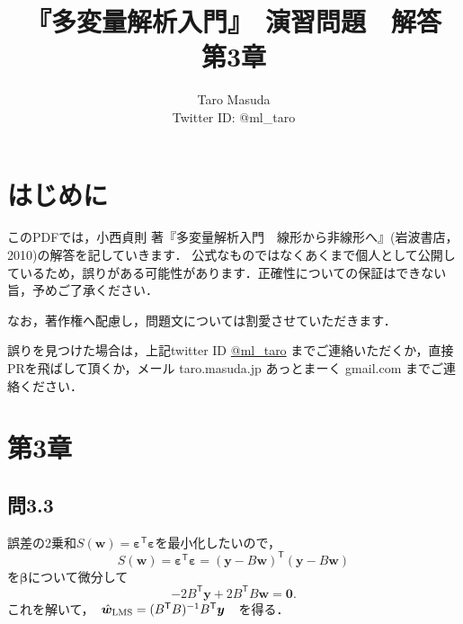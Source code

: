 \documentclass[pdflatex,ja=standard]{bxjsarticle}
\title{『多変量解析入門』　演習問題　解答　第3章}
\author{Taro Masuda \\ Twitter ID: @ml\_taro}
\begin{document}
\maketitle

\section*{はじめに}
このPDFでは，小西貞則 著『多変量解析入門　線形から非線形へ』(岩波書店，2010)の解答を記していきます．
公式なものではなくあくまで個人として公開しているため，誤りがある可能性があります．正確性についての保証はできない旨，予めご了承ください．

なお，著作権へ配慮し，問題文については割愛させていただきます．

誤りを見つけた場合は，上記twitter ID \href{https://twitter.com/ml_taro}{@ml\_taro} までご連絡いただくか，直接PRを飛ばして頂くか，メール taro.masuda.jp あっとまーく gmail.com までご連絡ください．

\section*{第3章}



\subsection*{問3.3}
誤差の2乗和$S(\bm{w}) = \bm{\varepsilon}^{\mathsf{T}} \bm{\varepsilon}$を最小化したいので，
\begin{equation}
S(\bm{w}) = \bm{\varepsilon}^{\mathsf{T}} \bm{\varepsilon} = (\bm{y} - B \bm{w})^{\mathsf{T}} (\bm{y} - B \bm{w})
\end{equation}
を$\bm{\beta}$について微分して
\begin{equation}
- 2 B^{\mathsf{T}} \bm{y} + 2 B^{\mathsf{T}} B \bm{w} = \bm{0}. 
\end{equation}
これを解いて，　$\hat{\bm{w}}_{\rm{LMS}} = (B^{\mathsf{T}} B)^{-1} B^{\mathsf{T}} \bm{y}$　を得る．
\end{document}
